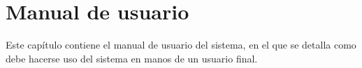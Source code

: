 

\chapter{Manual de usuario}
\thispagestyle{chapterpage}

Este capítulo contiene el manual de usuario del sistema, en el que 
se detalla como debe hacerse uso del sistema en manos de un usuario final.







